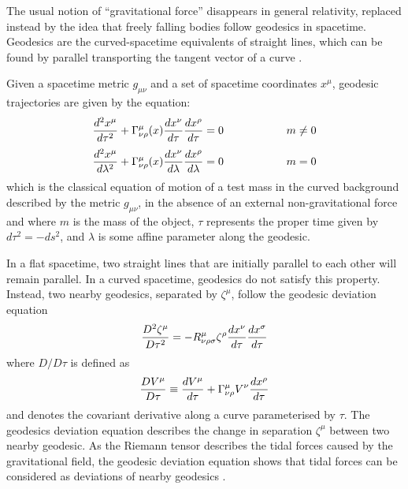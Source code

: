 \documentclass[binding=0.6cm, LaM]{sapthesis}
\begin{document}
	The usual notion of “gravitational force” disappears in general relativity, replaced instead 
	by the idea that freely falling bodies follow geodesics in spacetime.
	Geodesics are the curved-spacetime equivalents of straight lines, which can be found by 
	parallel transporting the tangent vector of a curve \cite{16}.

	Given a spacetime metric $g_{\mu\nu}$ and a set of spacetime coordinates $x^{\mu}$, 
	geodesic trajectories are given by the equation:
		\begin{equation}
			{{d^2x^{\mu}}\over{d\tau^2}} + \Gamma_{\nu\rho}^{\mu}(x){{dx^{\nu}}\over{d\tau}}{{dx^{\rho}}\over{d\tau}} = 0 \hspace*{2cm} m \neq 0
		\end{equation}
		\begin{equation}
			{{d^2x^{\mu}}\over{d\lambda^2}} + \Gamma_{\nu\rho}^{\mu}(x){{dx^{\nu}}\over{d\lambda}}{{dx^{\rho}}\over{d\lambda}} = 0 \hspace*{2cm} m = 0
		\end{equation}
	which is the classical equation of motion of a test mass in the curved background described 
	by the metric $g_{\mu\nu}$, in the absence of an external non-gravitational force and where $m$ is the mass
	of the object, $\tau$ represents the proper time given by $d\tau^2 = -ds^2$, 
	and $\lambda$ is some affine parameter along the geodesic.

	In a flat spacetime, two straight lines that are initially parallel to each other will remain parallel.
	In a curved spacetime, geodesics do not satisfy this property.
	Instead, two nearby geodesics, separated by $\zeta^{\mu}$, follow the geodesic deviation equation
		\begin{equation}
			{{D^2\zeta^{\mu}}\over{D\tau^2}} = -R^{\mu}_{\nu\rho\sigma}\zeta^{\rho}{{dx^{\nu}}\over{d\tau}}{{dx^{\sigma}}\over{d\tau}}
		\end{equation}
	where $D/D\tau$ is defined as
		\begin{equation}
			{{DV^{\mu}}\over{D\tau}} \equiv {{dV^{\mu}}\over{d\tau}} + \Gamma^{\mu}_{\nu\rho}V^{\nu}{{dx^{\rho}}\over{d\tau}}
		\end{equation}
	and denotes the covariant derivative along a curve parameterised by $\tau$. 
	The geodesics deviation equation describes the change in separation $\zeta^{\mu}$ between two nearby geodesic.
	As the Riemann tensor describes the tidal forces caused by the gravitational field, 
	the geodesic deviation equation shows that tidal forces can be considered as deviations of nearby geodesics \cite{6}.
\end{document}
